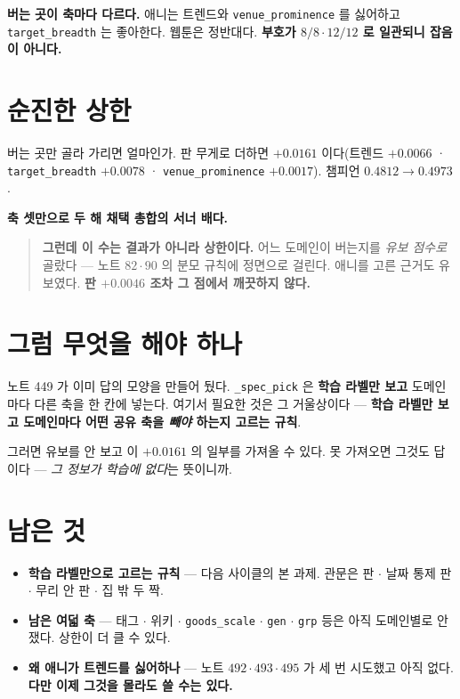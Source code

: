 \documentclass[11pt]{article}
\begin{document}
\textbf{버는 곳이 축마다 다르다.} 애니는 트렌드와
\texttt{venue\_prominence} 를 싫어하고 \texttt{target\_breadth} 는
좋아한다. 웹툰은 정반대다. \textbf{부호가 $8/8 \cdot 12/12$ 로 일관되니
잡음이 아니다.}

\section{순진한 상한}

버는 곳만 골라 가리면 얼마인가. 판 무게로 더하면 \textbf{$+0.0161$}
이다(트렌드 $+0.0066$ · \texttt{target\_breadth} $+0.0078$ ·
\texttt{venue\_prominence} $+0.0017$). 챔피언 $0.4812 \to 0.4973$.

\textbf{축 셋만으로 두 해 채택 총합의 서너 배다.}

\begin{quote}
\textbf{그런데 이 수는 결과가 아니라 상한이다.} 어느 도메인이 버는지를
\emph{유보 점수로} 골랐다 --- 노트 $82 \cdot 90$ 의 분모 규칙에 정면으로
걸린다. 애니를 고른 근거도 유보였다. \textbf{판 $+0.0046$ 조차 그 점에서
깨끗하지 않다.}
\end{quote}

\section{그럼 무엇을 해야 하나}

노트 449 가 이미 답의 모양을 만들어 뒀다. \texttt{\_spec\_pick} 은
\textbf{학습 라벨만 보고} 도메인마다 다른 축을 한 칸에 넣는다. 여기서
필요한 것은 그 거울상이다 --- \textbf{학습 라벨만 보고 도메인마다 어떤
공유 축을 \emph{빼야} 하는지 고르는 규칙}.

그러면 유보를 안 보고 이 $+0.0161$ 의 일부를 가져올 수 있다. 못 가져오면
그것도 답이다 --- \emph{그 정보가 학습에 없다}는 뜻이니까.

\section*{남은 것}

\begin{itemize}
\item \textbf{학습 라벨만으로 고르는 규칙} --- 다음 사이클의 본 과제.
관문은 판 $\cdot$ 날짜 통제 판 $\cdot$ 무리 안 판 $\cdot$ 집 밖 두 짝.
\item \textbf{남은 여덟 축} --- 태그 $\cdot$ 위키 $\cdot$
\texttt{goods\_scale} $\cdot$ \texttt{gen} $\cdot$ \texttt{grp} 등은
아직 도메인별로 안 쟀다. 상한이 더 클 수 있다.
\item \textbf{왜 애니가 트렌드를 싫어하나} --- 노트 $492 \cdot 493 \cdot
495$ 가 세 번 시도했고 아직 없다. \textbf{다만 이제 그것을 몰라도 쓸 수는
있다.}
\end{itemize}
\end{document}
